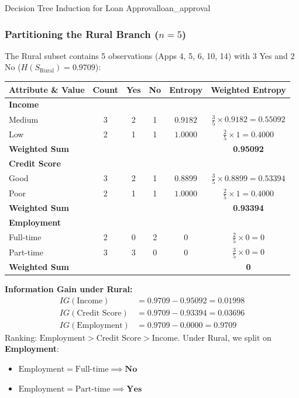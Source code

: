 \begin{example}{Decision Tree Induction for Loan Approval}{loan_approval}
\subsubsection{Partitioning the Rural Branch (\texorpdfstring{$n = 5$}{n = 5})}
The Rural subset contains 5 observations (Apps 4, 5, 6, 10, 14) with $3$ Yes and $2$ No ($H(S_{\text{Rural}}) = 0.9709$):
\begin{center}\renewcommand{\arraystretch}{1.35}
\begin{tabular}{lccccc}
\toprule
\textbf{Attribute \& Value} & \textbf{Count} & \textbf{Yes} & \textbf{No} & \textbf{Entropy} & \textbf{Weighted Entropy} \\
\midrule
\textbf{Income} & & & & & \\
Medium & 3 & 2 & 1 & $0.9182$ & $\frac{3}{5} \times 0.9182 = 0.55092$ \\
Low & 2 & 1 & 1 & $1.0000$ & $\frac{2}{5} \times 1 = 0.4000$ \\
\textbf{Weighted Sum} & & & & & \textbf{0.95092} \\
\midrule
\textbf{Credit Score} & & & & & \\
Good & 3 & 2 & 1 & $0.8899$ & $\frac{3}{5} \times 0.8899 = 0.53394$ \\
Poor & 2 & 1 & 1 & $1.0000$ & $\frac{2}{5} \times 1 = 0.4000$ \\
\textbf{Weighted Sum} & & & & & \textbf{0.93394} \\
\midrule
\textbf{Employment} & & & & & \\
Full-time & 2 & 0 & 2 & $0$ & $\frac{2}{5} \times 0 = 0$ \\
Part-time & 3 & 3 & 0 & $0$ & $\frac{3}{5} \times 0 = 0$ \\
\textbf{Weighted Sum} & & & & & \textbf{0} \\
\bottomrule
\end{tabular}
\end{center}

\textbf{Information Gain under Rural:}
\begin{align*}
    IG(\text{Income}) &= 0.9709 - 0.95092 = 0.01998 \\[4pt]
    IG(\text{Credit Score}) &= 0.9709 - 0.93394 = 0.03696 \\[4pt]
    IG(\text{Employment}) &= 0.9709 - 0.0000 = \mathbf{0.9709}
\end{align*}
Ranking: $\text{Employment} > \text{Credit Score} > \text{Income}$.
Under Rural, we split on \textbf{Employment}:
\begin{itemize}
    \item $\text{Employment} = \text{Full-time} \implies \mathbf{No}$
    \item $\text{Employment} = \text{Part-time} \implies \mathbf{Yes}$
\end{itemize}


\end{example}
